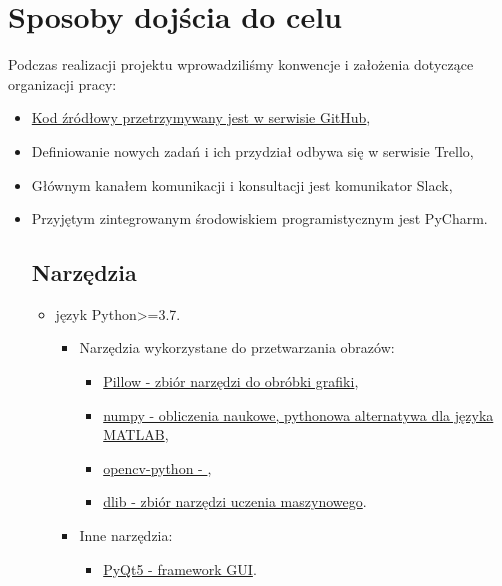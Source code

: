 \section{Sposoby dojścia do celu}
Podczas realizacji projektu wprowadziliśmy konwencje i założenia dotyczące organizacji pracy:
\begin{itemize}
    \item \href{https://github.com/majabojarska/RiPO_proj}{Kod źródłowy przetrzymywany jest w serwisie GitHub},
    \item Definiowanie nowych zadań i ich przydział odbywa się w serwisie Trello,
    \item Głównym kanałem komunikacji i konsultacji jest komunikator Slack,
    \item Przyjętym zintegrowanym środowiskiem programistycznym jest PyCharm.
    
\subsection{Narzędzia}

\renewcommand\labelitemii{$\bullet$}
\renewcommand\labelitemiii{$\bullet$}

\begin{itemize}
    \item język Python>=3.7.
    \begin{itemize}
        \item Narzędzia wykorzystane do przetwarzania obrazów:
        \begin{itemize}     
            \item \href{https://pillow.readthedocs.io/en/stable/}{Pillow - zbiór narzędzi do obróbki grafiki}\cite{pillow},
            \item \href{https://numpy.org/}{numpy - obliczenia naukowe, pythonowa alternatywa dla języka MATLAB}\cite{numpy},
            \item \href{https://pypi.org/project/opencv-python/}{opencv-python - }\cite{opencv-python},
            \item \href{http://dlib.net/}{dlib - zbiór narzędzi uczenia maszynowego}\cite{dlib}.
        \end{itemize}   
        \item Inne narzędzia:
        \begin{itemize}
            \item \href{https://pypi.org/project/PyQt5/}{PyQt5 - framework GUI}\cite{pyqt5}.
        \end{itemize}
    \end{itemize}
\end{itemize}


\end{itemize}
